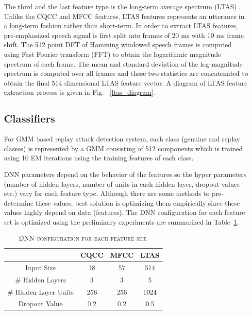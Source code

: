\documentclass{article}
\begin{document}
The third and the last feature type is the long-term average spectrum (LTAS) \cite{muckenhirn2016presentation}. Unlike
the CQCC and MFCC features, LTAS features represents an utterance in a long-term fashion rather than short-term. In
order to extract LTAS features, pre-emphasized speech signal is first split into frames of 20 ms with 10 ms frame
shift. The 512 point DFT of Hamming windowed speech frames is computed using Fast Fourier transform (FFT) to obtain the
logarithmic magnitude spectrum of each frame. The mean and standard deviation of the log-magnitude spectrum is computed
over all frames and these two statistics are concatenated to obtain the final 514 dimensional LTAS feature vector. A
diagram of LTAS feature extraction process is given in Fig. ~\ref{ltas_diagram}.

\subsection{Classifiers}
\label{classifiers}
For GMM based replay attack detection system, each class (genuine and replay classes) is represented by a GMM
consisting of 512 components which is trained using 10 EM iterations using the training features of each class.

DNN parameters depend on the behavior of the features so the hyper parameters (number of hidden layers, number of
units in each hidden layer, dropout values etc.) vary for each feature type. Although there are some methods to
pre-determine these values, best solution is optimizing them empirically since these values highly depend on data
(features). The DNN configuration for each feature set is optimized using the preliminary experiments are summarized
in Table~\ref{dnn_classfier}.

\begin{table}[!htb]
    \centering
    \caption{\textsc{DNN configuration for each feature set.}}
    \vspace{4mm}
    \label{dnn_classfier}
    \begin{tabular}{|c|c|c|c|}
        \hline
                              & CQCC & MFCC & LTAS \\ \hline
        Input Size            & 18   & 57   & 514  \\
        \# Hidden Layers      & 3    & 3    & 5    \\
        \# Hidden Layer Units & 256  & 256  & 1024 \\
        Dropout Value         & 0.2  & 0.2  & 0.5  \\
        \hline
    \end{tabular}
\end{table}
\end{document}
